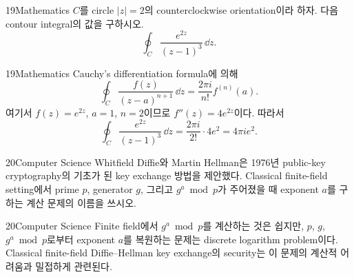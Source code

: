\documentclass[12pt,aspectratio=169]{beamer}
\begin{document}
\begin{problemframe}{19}{Mathematics}
$C$를 circle $|z|=2$의 counterclockwise orientation이라 하자. 다음 contour integral의 값을 구하시오.
\[
\oint_C \frac{e^{2z}}{(z-1)^3}\,\dd z.
\]
\end{problemframe}

\begin{solutionframe}{19}{Mathematics}
Cauchy's differentiation formula에 의해
\[
\oint_C \frac{f(z)}{(z-a)^{n+1}}\,\dd z
=\frac{2\pi i}{n!}f^{(n)}(a).
\]
여기서 $f(z)=e^{2z}$, $a=1$, $n=2$이므로 $f''(z)=4e^{2z}$이다. 따라서
\[
\oint_C \frac{e^{2z}}{(z-1)^3}\,\dd z
=\frac{2\pi i}{2!}\cdot4e^2
=4\pi i e^2.
\]
\end{solutionframe}

\begin{problemframe}{20}{Computer Science}
Whitfield Diffie와 Martin Hellman은 1976년 public-key cryptography의 기초가 된 key exchange 방법을 제안했다. Classical finite-field setting에서 prime $p$, generator $g$, 그리고 $g^a\bmod p$가 주어졌을 때 exponent $a$를 구하는 계산 문제의 이름을 쓰시오.
\end{problemframe}

\begin{solutionframe}{20}{Computer Science}
Finite field에서 $g^a\bmod p$를 계산하는 것은 쉽지만, $p$, $g$, $g^a\bmod p$로부터 exponent $a$를 복원하는 문제는 discrete logarithm problem이다. Classical finite-field Diffie--Hellman key exchange의 security는 이 문제의 계산적 어려움과 밀접하게 관련된다.
\end{solutionframe}
\end{document}
